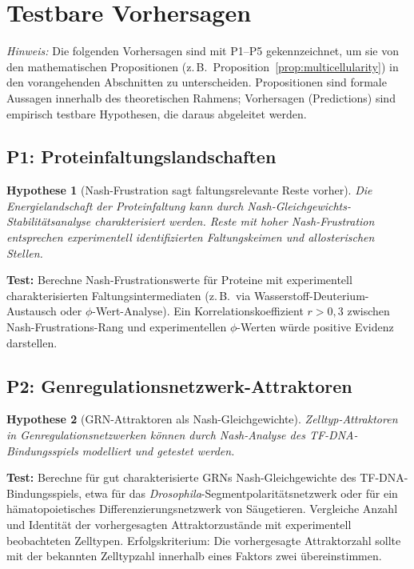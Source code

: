 \documentclass[12pt,a4paper]{article}
\newtheorem{hypothesis}{Hypothese}
\theoremstyle{remark}
\begin{document}
\section{Testbare Vorhersagen}
\label{sec:predictions}

\noindent\textit{Hinweis:} Die folgenden Vorhersagen sind mit P1--P5 gekennzeichnet, um sie von den mathematischen Propositionen (z.\,B.\ Proposition~\ref{prop:multicellularity}) in den vorangehenden Abschnitten zu unterscheiden. Propositionen sind formale Aussagen innerhalb des theoretischen Rahmens; Vorhersagen (Predictions) sind empirisch testbare Hypothesen, die daraus abgeleitet werden.

\subsection{P1: Proteinfaltungslandschaften}

\begin{hypothesis}[Nash-Frustration sagt faltungsrelevante Reste vorher]
Die Energielandschaft der Proteinfaltung kann durch Nash-Gleichgewichts-Stabilitätsanalyse charakterisiert werden. Reste mit hoher Nash-Frustration entsprechen experimentell identifizierten Faltungskeimen und allosterischen Stellen.
\end{hypothesis}

\textbf{Test:} Berechne Nash-Frustrationswerte für Proteine mit experimentell charakterisierten Faltungsintermediaten (z.\,B.\ via Wasserstoff-Deuterium-Austausch oder $\phi$-Wert-Analyse). Ein Korrelationskoeffizient $r > 0{,}3$ zwischen Nash-Frustrations-Rang und experimentellen $\phi$-Werten würde positive Evidenz darstellen.

\subsection{P2: Genregulationsnetzwerk-Attraktoren}

\begin{hypothesis}[GRN-Attraktoren als Nash-Gleichgewichte]
Zelltyp-Attraktoren in Genregulationsnetzwerken können durch Nash-Analyse des TF-DNA-Bindungsspiels modelliert und getestet werden.
\end{hypothesis}

\textbf{Test:} Berechne für gut charakterisierte GRNs Nash-Gleichgewichte des TF-DNA-Bindungsspiels, etwa für das \textit{Drosophila}-Segmentpolaritätsnetzwerk oder für ein hämatopoietisches Differenzierungsnetzwerk von Säugetieren. Vergleiche Anzahl und Identität der vorhergesagten Attraktorzustände mit experimentell beobachteten Zelltypen. Erfolgskriterium: Die vorhergesagte Attraktorzahl sollte mit der bekannten Zelltypzahl innerhalb eines Faktors zwei übereinstimmen.
\end{document}
